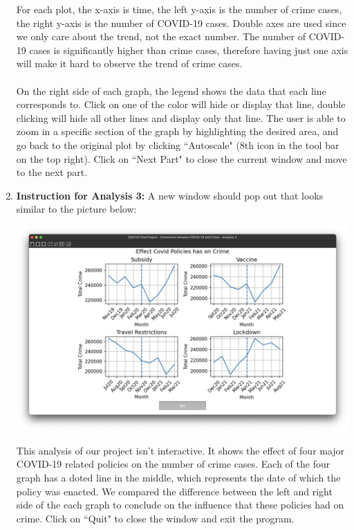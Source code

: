 \documentclass[fontsize=11pt]{article}
\begin{document}
\begin{enumerate}
  For each plot, the x-axis is time, the left y-axis is the number of crime cases, the right y-axis is the number of COVID-19 cases. Double axes are used since we only care about the trend, not the exact number. The number of COVID-19 cases is significantly higher than crime cases, therefore having just one axis will make it hard to observe the trend of crime cases. 
  \\
  \\
  On the right side of each graph, the legend shows the data that each line corresponds to. Click on one of the color will hide or display that line, double clicking will hide all other lines and display only that line. The user is able to zoom in a specific section of the graph by highlighting the desired area, and go back to the original plot by clicking ``Autoscale" (8th icon in the tool bar on the top right). Click on ``Next Part" to close the current window and move to the next part.
  
  \item \textbf{Instruction for Analysis 3:} A new window should pop out that looks similar to the picture below: 
  
  \includegraphics[scale=0.3]{screenshot7.png}
  
  This analysis of our project isn't interactive. It shows the effect of four major COVID-19 related policies on the number of crime cases. Each of the four graph has a doted line in the middle, which represents the date of which the policy was enacted. We compared the difference between the left and right side of the each graph to conclude on the influence that these policies had on crime. Click on ``Quit" to close the window and exit the program.
 
\end{enumerate}
\end{document}
